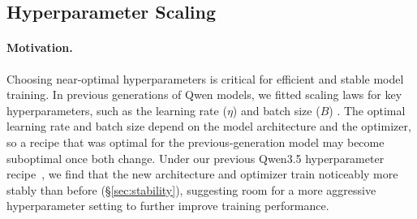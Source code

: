 \subsection{Hyperparameter Scaling}
\label{sec:hpscaling}

\paragraph{Motivation.}
\label{sec:hpscaling-motivation}





Choosing near-optimal hyperparameters is critical for efficient and stable model training. In previous generations of Qwen models, we fitted scaling laws for key hyperparameters, such as the learning rate ($\eta$) and batch size ($B$) \citep{qwen25, yang2025qwen3}. The optimal learning rate and batch size depend on the model architecture and the optimizer, so a recipe that was optimal for the previous-generation model may become suboptimal once both change.
Under our previous Qwen3.5 hyperparameter recipe~\citep{qwenteam2026qwen35}, we find that the new architecture and optimizer train noticeably more stably than before (\S\ref{sec:stability}), suggesting room for a more aggressive hyperparameter setting to further improve training performance.

